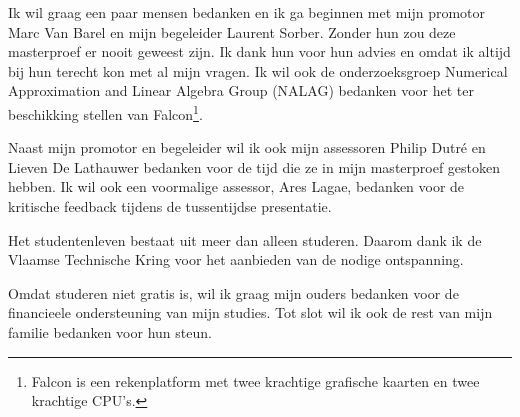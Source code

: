 \documentclass[master=cws ,masteroption=gs]{kulemt}
\begin{document}
\begin{preface}
	Ik wil graag een paar mensen bedanken en ik ga beginnen met mijn promotor Marc Van Barel en mijn begeleider Laurent Sorber. Zonder hun zou deze masterproef er nooit geweest zijn. Ik dank hun voor hun advies en omdat ik altijd bij hun terecht kon met al mijn vragen. Ik wil ook de onderzoeksgroep Numerical Approximation and Linear Algebra Group (NALAG) bedanken voor het ter beschikking stellen van Falcon\footnote{Falcon is een rekenplatform met twee krachtige grafische kaarten en twee krachtige CPU's.}.
	
	Naast mijn promotor en begeleider wil ik ook mijn assessoren Philip Dutr\'e en Lieven De Lathauwer bedanken voor de tijd die ze in mijn masterproef gestoken hebben. Ik wil ook een voormalige assessor, Ares Lagae, bedanken voor de kritische feedback tijdens de tussentijdse presentatie.

	Het studentenleven bestaat uit meer dan alleen studeren. Daarom dank ik de Vlaamse Technische Kring voor het aanbieden van de nodige ontspanning.
	
	Omdat studeren niet gratis is, wil ik graag mijn ouders bedanken voor de financieele ondersteuning van mijn studies.
	Tot slot wil ik ook de rest van mijn familie bedanken voor hun steun.
\end{preface}

\tableofcontents*

\begin{abstract}
	We kunnen een tensor voorstellen als een meerdimensionale rij. Er zijn algoritmes die de tensor ontbinden in een Canonieke Polyadische Decompositie (CPD). Deze ontbinding kan ook een benadering zijn. In deze masterproef gaan we kernels ontwikkelen om gradi\"ent gebaseerde optimalisatie-algoritmes te ondersteunen. Dit is een groep van algoritmes die op zoek gaat naar de best benaderende CPD voor een gegeven tensor. 
  
	Na de inleiding beschrijven we de wiskundige concepten die we nodig hebben om de kernels te ontwikkelen. Vervolgens bespreken het programmeermodel van OpenCL en de architectuur van de AMD Radeon HD 6970. Al onze kernels zijn geoptimaliseerd voor deze grafische kaart.
  
	Nadat we weten hoe OpenCL en de grafische kaart in elkaar zitten gaan we een paar berekeningen doen. Met deze berekeningen onderzoeken we de theoretisch grensen van de kernels die we gaan ontwikkelen. Nadat de kernels een groen licht gekregen hebben bespreken we stapsgewijs hoe de kernels in elkaar zitten en waarom die zo in elkaar zitten. We zullen bij elke stap ook een paar metingen doen zodat de effecten van de optimalisaties zichtbaar zijn.
  
	Eenmaal de kernels ontwikkeld zijn gaan we metingen doen en die bespreken. Tot slot gaan we het werk evalueren en uitbreidingsvoorstellen doen.

	
\end{abstract}
\end{document}
